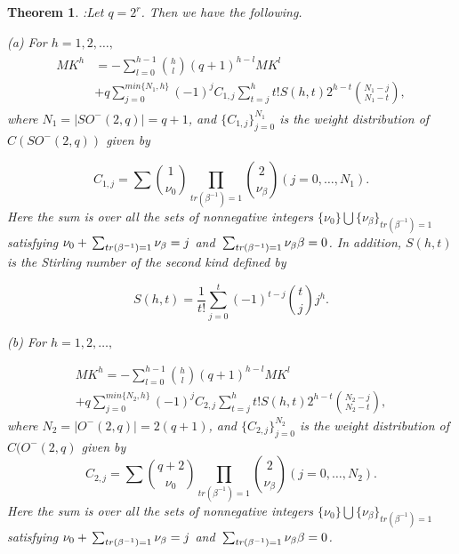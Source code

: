 \documentclass[a4,12pt]{elsart}
\newtheorem{theorem}{Theorem}
\begin{document}
\begin{theorem}:\label{A}
Let $q=2^{r}$. Then we have the following.

(a) For $h = 1,2,\ldots,$
\begin{align}\label{a1}
 \begin{split}
     MK^h &= -\sum_{l=0}^{h-1}{h \choose l}(q+1)^{h-l} MK^l\\
        &+q\sum_{j=0}^{min\{N_1,h\}}(-1)^{j}C_{1,j}\sum_{t=j}^{h}t!S(h,t)2^{h-t}{N_1-j \choose
        N_1-t},
  \end{split}
 \end{align}
where $N_1 = \mid SO^-(2,q) \mid = q+1$, and
$\{C_{1,j}\}_{j=0}^{N_1}$ is the weight distribution of
$C(SO^-(2,q))$ given by

\begin{equation}\label{a2}
C_{1,j} = \sum {1 \choose \nu_0} \prod_{tr(\beta^{-1}) = 1} {2
\choose \nu_\beta} (j = 0, \ldots, N_1).
\end{equation}
Here the sum is over all the sets of nonnegative integers $\{\nu_0\}
\bigcup \{\nu_\beta\}_{tr(\beta^{-1}) = 1}$ satisfying $\nu_0 +
{\displaystyle}\sum_{tr(\beta^{-1}) = 1} \nu_\beta = j$ and
${\displaystyle}\sum_{tr(\beta^{-1}) = 1} \nu_\beta \beta = 0$. In addition,
$S(h,t)$ is the Stirling number of the second kind defined by

\begin{equation}\label{a3}
S(h,t)=\frac{1}{t!}\sum_{j=0}^{t}(-1)^{t-j}{\binom{t}{j}}j ^{h} .
\end{equation}

(b) For $h = 1,2,\ldots,$

 \begin{multline}\label{a4}
     MK^h = -\sum_{l=0}^{h-1}{h \choose l}(q+1)^{h-l} MK^l\\
        +q\sum_{j=0}^{min\{N_2,h\}}(-1)^{j}C_{2,j}\sum_{t=j}^{h}t!S(h,t)2^{h-t}{N_2-j \choose
        N_2-t},
  \end{multline}
 where $N_2 = \mid O^-(2,q) \mid = 2(q+1)$, and
$\{C_{2,j}\}_{j=0}^{N_2}$ is the weight distribution of $C(O^-(2,q)$
given by
\begin{equation}\label{a5}
C_{2,j} = \sum {q+2 \choose \nu_0} \prod_{tr(\beta^{-1}) = 1} {2
\choose \nu_\beta} (j = 0, \ldots, N_2).
\end{equation}
Here the sum is over all the sets of nonnegative integers $\{\nu_0\}
\bigcup \{\nu_\beta\}_{tr(\beta^{-1}) = 1}$ satisfying $\nu_0 +
{\displaystyle}\sum_{tr(\beta^{-1}) = 1} \nu_\beta = j$ and
${\displaystyle}\sum_{tr(\beta^{-1}) = 1} \nu_\beta \beta = 0$.\\


\end{theorem}
\end{document}
